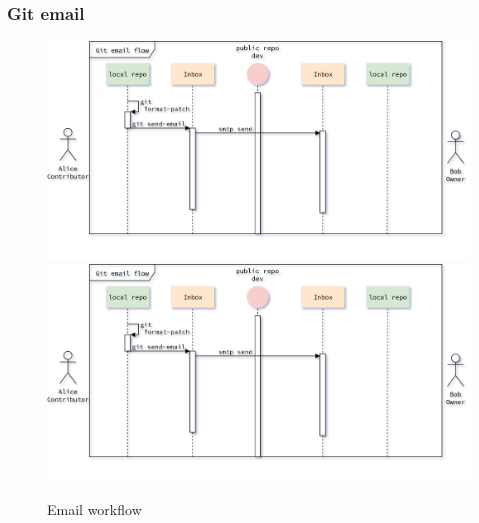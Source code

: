 \begin{frame}
    \frametitle{Git email}
    \begin{figure}
        \begin{center}
            {
                \includegraphics[height=0.7\textheight,keepaspectratio]{./images/EmailWorkflow_SendFirstPatch.png}
            }
            {
                \includegraphics[height=0.75\textheight,keepaspectratio]{./images/EmailWorkflow_SendFirstPatch.png}
            }
            \caption{Email workflow}
        \end{center}
    \end{figure}
\end{frame}

